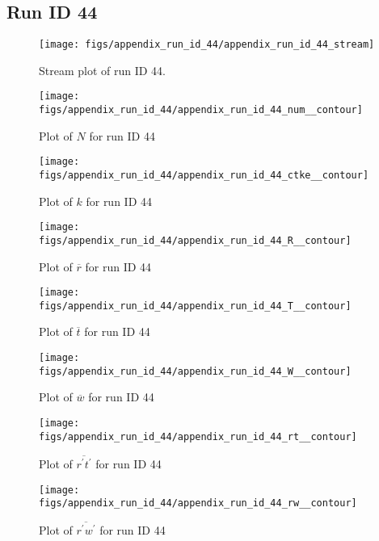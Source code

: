 \subsection{Run ID 44}
\begin{figure}[H]
\centering
\texttt{[image: figs/appendix\_run\_id\_44/appendix\_run\_id\_44\_stream]}
\caption{Stream plot of run ID 44.}
\label{fig:appendix_run_id_44_stream}
\end{figure}


\begin{figure}[H]
\centering
\texttt{[image: figs/appendix\_run\_id\_44/appendix\_run\_id\_44\_num\_\_contour]}
\caption{Plot of $N$ for run ID 44}
\label{fig:appendix_run_id_44_num__contour}
\end{figure}


\begin{figure}[H]
\centering
\texttt{[image: figs/appendix\_run\_id\_44/appendix\_run\_id\_44\_ctke\_\_contour]}
\caption{Plot of $k$ for run ID 44}
\label{fig:appendix_run_id_44_ctke__contour}
\end{figure}


\begin{figure}[H]
\centering
\texttt{[image: figs/appendix\_run\_id\_44/appendix\_run\_id\_44\_R\_\_contour]}
\caption{Plot of $\overline{r}$ for run ID 44}
\label{fig:appendix_run_id_44_R__contour}
\end{figure}


\begin{figure}[H]
\centering
\texttt{[image: figs/appendix\_run\_id\_44/appendix\_run\_id\_44\_T\_\_contour]}
\caption{Plot of $\overline{t}$ for run ID 44}
\label{fig:appendix_run_id_44_T__contour}
\end{figure}


\begin{figure}[H]
\centering
\texttt{[image: figs/appendix\_run\_id\_44/appendix\_run\_id\_44\_W\_\_contour]}
\caption{Plot of $\overline{w}$ for run ID 44}
\label{fig:appendix_run_id_44_W__contour}
\end{figure}


\begin{figure}[H]
\centering
\texttt{[image: figs/appendix\_run\_id\_44/appendix\_run\_id\_44\_rt\_\_contour]}
\caption{Plot of $\overline{r^\prime t^\prime}$ for run ID 44}
\label{fig:appendix_run_id_44_rt__contour}
\end{figure}


\begin{figure}[H]
\centering
\texttt{[image: figs/appendix\_run\_id\_44/appendix\_run\_id\_44\_rw\_\_contour]}
\caption{Plot of $\overline{r^\prime w^\prime}$ for run ID 44}
\label{fig:appendix_run_id_44_rw__contour}
\end{figure}


